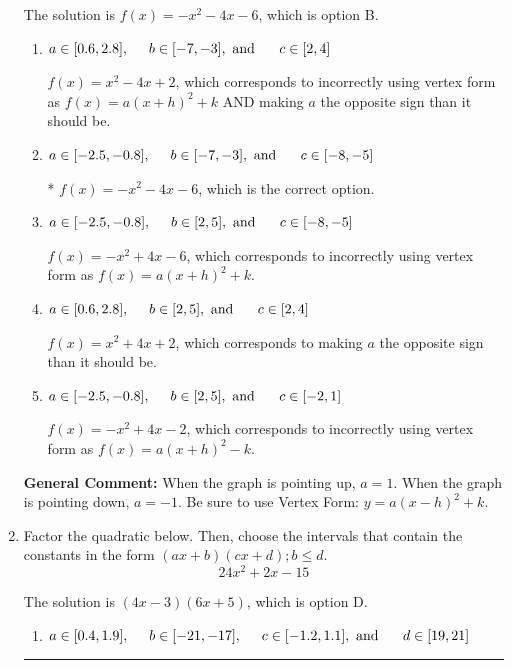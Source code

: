 \documentclass{extbook}[14pt]
\newcommand{\litem}[1]{\item #1

\rule{\textwidth}{0.4pt}}
\begin{document}
\begin{enumerate}
{The solution is \( f(x) = -x^{2} -4 x -6 \), which is option B.\begin{enumerate}[label=\Alph*.]
\item \( a \in [0.6, 2.8], \hspace*{5mm} b \in [-7, -3], \text{ and } \hspace*{5mm} c \in [2, 4] \)

$f(x)=x^{2} -4 x + 2$, which corresponds to incorrectly using vertex form as $f(x) = a(x+h)^2+k$ AND making $a$ the opposite sign than it should be.
\item \( a \in [-2.5, -0.8], \hspace*{5mm} b \in [-7, -3], \text{ and } \hspace*{5mm} c \in [-8, -5] \)

* $f(x)=-x^{2} -4 x -6$, which is the correct option.
\item \( a \in [-2.5, -0.8], \hspace*{5mm} b \in [2, 5], \text{ and } \hspace*{5mm} c \in [-8, -5] \)

$f(x)=-x^{2} +4 x -6$, which corresponds to incorrectly using vertex form as $f(x) = a(x+h)^2+k$.
\item \( a \in [0.6, 2.8], \hspace*{5mm} b \in [2, 5], \text{ and } \hspace*{5mm} c \in [2, 4] \)

$f(x)=x^{2} +4 x + 2$, which corresponds to making $a$ the opposite sign than it should be.
\item \( a \in [-2.5, -0.8], \hspace*{5mm} b \in [2, 5], \text{ and } \hspace*{5mm} c \in [-2, 1] \)

$f(x)=-x^{2} +4 x -2$, which corresponds to incorrectly using vertex form as $f(x) = a(x+h)^2 - k$.
\end{enumerate}

\textbf{General Comment:} When the graph is pointing up, $a=1$. When the graph is pointing down, $a=-1$. Be sure to use Vertex Form: $y = a(x-h)^2+k$.
}
\litem{
Factor the quadratic below. Then, choose the intervals that contain the constants in the form $(ax+b)(cx+d); b \leq d.$
\[ 24x^{2} +2 x -15 \]

The solution is \( (4x -3)(6x + 5) \), which is option D.\begin{enumerate}[label=\Alph*.]
\item \( a \in [0.4, 1.9], \hspace*{5mm} b \in [-21, -17], \hspace*{5mm} c \in [-1.2, 1.1], \text{ and } \hspace*{5mm} d \in [19, 21] \)


\end{enumerate}}
\end{enumerate}
\end{document}
